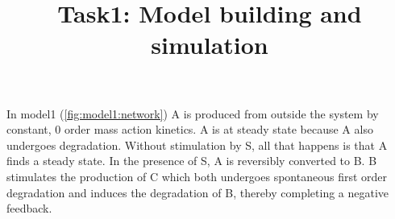 \documentclass[11pt]{article}
\title{Task1: Model building and simulation}
\begin{document}
    \maketitle

    In model1 (\cref{fig:model1:network}) A is produced from outside the system by constant, 0 order mass action kinetics. A is at steady state because
    A also undergoes degradation. Without stimulation by S, all that happens is that A finds a steady state. In
    the presence of S, A is reversibly converted to B. B stimulates the production of C which both undergoes
    spontaneous first order degradation and induces the degradation of B, thereby completing a negative feedback.

    \begin{figure}[h]

    \end{figure}
\end{document}
